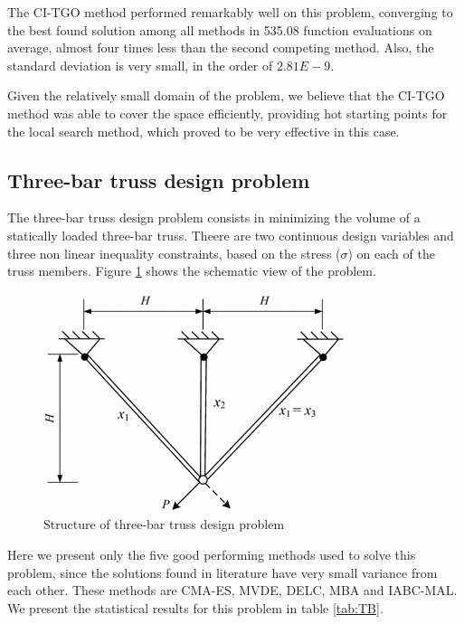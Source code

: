 The CI-TGO method performed remarkably well on this problem, converging to the best found solution among all methods in 535.08 function evaluations on average, almost four times less than the second competing method. Also, the standard deviation is very small, in the order of $2.81E-9$. 

Given the relatively small domain of the problem, we believe that the CI-TGO method was able to cover the space efficiently, providing hot starting points for the local search method, which proved to be very effective in this case.




\subsection{Three-bar truss design problem}

The three-bar truss design problem \citep{TB} consists in minimizing the volume of a statically loaded three-bar truss. Theere are two continuous design variables and three non linear inequality constraints, based on the stress ($\sigma$) on each of the truss members. Figure \ref{fig:TB} shows the schematic view of the problem.

\begin{figure}[h]
\begin{center}
\includegraphics[scale=0.5]{Imgs/TB.png}
\end{center}
\captionsetup{justification=centering}
\caption{Structure of three-bar truss design problem}\label{fig:TB}
\end{figure}


Here we present only the five good performing methods used to solve this problem, since the solutions found in literature have very small variance from each other. These methods are CMA-ES, MVDE, DELC, MBA and IABC-MAL. We present the statistical results for this problem in table \ref{tab:TB}.


